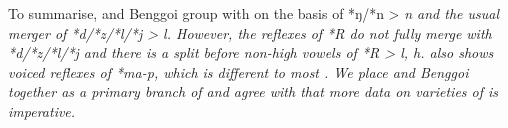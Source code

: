 To summarise,
 and Benggoi group with  on the basis of
*ŋ/*n > \it{n} and the usual merger of *d/*z/*l/*j > \it{l.} However,
the reflexes of *R do not fully merge with *d/*z/*l/*j
and there is a split before non-high vowels of *R > \it{l, h}.
 also shows voiced reflexes of *ma-p,
which is different to most .
We place  and Benggoi together as a primary branch of 
and agree with \citet[135]{Collins1986} that more data on varieties
of  is imperative.
